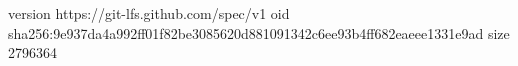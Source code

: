 version https://git-lfs.github.com/spec/v1
oid sha256:9e937da4a992ff01f82be3085620d881091342c6ee93b4ff682eaeee1331e9ad
size 2796364
